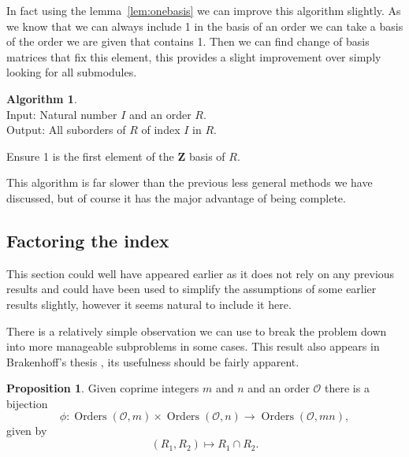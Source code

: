 \documentclass[12pt,a4paper,abstracton,bibtotoc]{scrreprt}
\theoremstyle{definition}
\newtheorem{prop}{Proposition}
\newtheorem{alg}{Algorithm}
\newcommand{\ZZ}{\mathbf{Z}}
\renewcommand{\O}{\mathcal{O}}
\DeclareMathOperator{\Orders}{Orders}
\begin{document}
In fact using the lemma~\ref{lem:onebasis} we can improve this algorithm slightly.
As we know that we can always include 1 in the basis of an order we can take a basis of the order we are given that contains 1.
Then we can find change of basis matrices that fix this element, this provides a slight improvement over simply looking for all submodules.

\begin{alg}~\\
Input: Natural number $I$ and an order $R$.\\
Output: All suborders of $R$ of index $I$ in $R$.\\
\begin{algorithm}[H]
Ensure 1 is the first element of the $\ZZ$ basis of $R$.\\
\end{algorithm}
\end{alg}

This algorithm is far slower than the previous less general methods we have discussed, but of course it has the major advantage of being complete.

\subsection{Factoring the index}
This section could well have appeared earlier as it does not rely on any previous results and could have been used to simplify the assumptions of some earlier results slightly, however it seems natural to include it here.

There is a relatively simple observation we can use to break the problem down into more manageable subproblems in some cases.
This result also appears in Brakenhoff's thesis \cite[pp. 49--50]{brakenhoff}, its usefulness should be fairly apparent.

\begin{prop}
Given coprime integers $m$ and $n$ and an order $\O$ there is a bijection
\[
\phi\colon\Orders(\O,m)\times\Orders(\O,n) \to \Orders(\O,mn),
\]
given by
\[
(R_1,R_2) \mapsto R_1 \cap R_2.
\]
\end{prop}
\end{document}
